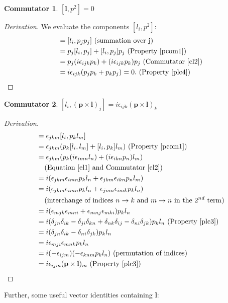\documentclass[12pt,a4paper]{report}
\theoremstyle{definition}
\newtheorem{commutator}{Commutator}[section]
\newenvironment{derivation}
  {\renewcommand\qedsymbol{$\square$}\begin{proof}[Derivation]}
  {\end{proof}}
\theoremstyle{remark}
\theoremstyle{remark}
\begin{document}
\begin{appendices}
\begin{commutator}\label{cl6}
$[\textbf{l},p^2]=0$
\end{commutator} 
\begin{derivation}
We evaluate the components $[l_i,p^2]$:
\begin{align*}
[l_i,p^2] &= [l_i,p_jp_j] \text{ (summation over j)} \\
&= p_j[l_i,p_j]+[l_i,p_j]p_j \text{ (Property~\ref{pcom1})} \\
&= p_j(i\epsilon_{ijk}p_k)+(i\epsilon_{ijk}p_k)p_j \text{ (Commutator~\ref{cl2})} \\
&= i\epsilon_{ijk}(p_jp_k+p_kp_j) = 0. \text{ (Property~\ref{plc4})} \\
\end{align*}
\end{derivation}

\begin{commutator}\label{cl7}
$[l_i,(\textbf{p}\times\textbf{l})_j]=i\epsilon_{ijk}(\textbf{p}\times\textbf{l})_k$
\end{commutator} 
\begin{derivation}
\begin{align*}
[l_i,(\textbf{p}\times\textbf{l})_j] &= \epsilon_{jkm}[l_i,p_kl_m] \\
&= \epsilon_{jkm}(p_k[l_i,l_m]+[l_i,p_k]l_m) \text{ (Property~\ref{pcom1})} \\
&= \epsilon_{jkm}(p_k(i\epsilon_{imn}l_n)+(i\epsilon_{ikn}p_n)l_m) \\
&\phantom{=} \text{ (Equation~\ref{el1} and Commutator~\ref{cl2})} \\
&= i(\epsilon_{jkm}\epsilon_{imn}p_kl_n+\epsilon_{jkm}\epsilon_{ikn}p_nl_m) \\
&= i(\epsilon_{jkm}\epsilon_{imn}p_kl_n+\epsilon_{jmn}\epsilon_{imk}p_kl_n) \\
&\phantom{=} \text{ (interchange of indices }n\rightarrow k \text{ and }m\rightarrow n \text{ in the }2^{nd} \text{ term)} \\
&= i(\epsilon_{mjk}\epsilon_{mni}+\epsilon_{mnj}\epsilon_{mki})p_kl_n \\
&= i(\delta_{jn}\delta_{ik}-\delta_{ji}\delta_{kn}+\delta_{nk}\delta_{ij}-\delta_{ni}\delta_{jk})p_kl_n \text{ (Property~\ref{plc3})} \\
&= i(\delta_{jn}\delta_{ik}-\delta_{ni}\delta_{jk})p_kl_n \\
&= i\epsilon_{mji}\epsilon_{mnk}p_kl_n \\
&= i(-\epsilon_{ijm})(-\epsilon_{knm}p_kl_n) \text{ (permutation of indices)} \\
&=i\epsilon_{ijm}(\textbf{p}\times\textbf{l})_m \text{ (Property~\ref{plc3})}
\end{align*}
\end{derivation}
Further, some useful vector identities containing $\textbf{l}$:


\end{appendices}
\end{document}
